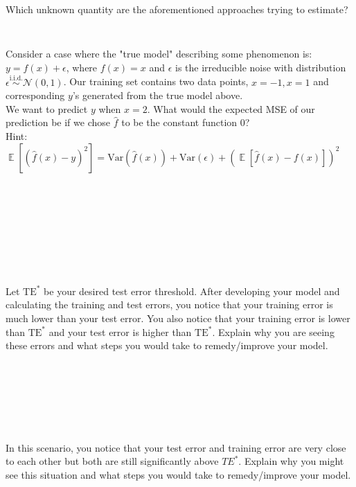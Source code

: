 \documentclass{article}
\DeclareMathOperator{\E}{\mathbb{E}}
\begin{document}
\bigskip
Which unknown quantity are the aforementioned approaches trying to estimate?
\begin{Verbatim}[frame=single]


\end{Verbatim}
\bigskip
Consider a case where the "true model" describing some phenomenon is:
$y=f(x)+\epsilon$, where $f(x) = x$ and $\epsilon$ is the irreducible noise
with
distribution $\epsilon \overset{\mathrm{i.i.d.}}{\sim}\mathcal{N}(0,1)$. Our
training set contains two data
points, $x = -1, x=1$ and corresponding $y$'s generated from the true model
above.
\\
We want to predict $y$ when $x = 2$. What would the expected MSE of our
prediction be if we chose $\hat{f}$ to be the constant function $0$?
\\
Hint:
$\E\left[\left(\hat{f}(x)-y\right)^2\right]=\text{Var}\left(\hat{f}(x)\right)+
  \text{Var}(\epsilon)+\left(\E\left[\hat{f}(x)-f(x)\right]\right)^2$
\begin{Verbatim}[frame=single]









\end{Verbatim}

\bigskip
Let $\mathrm{TE}^*$ be your desired test error threshold. After developing your
model and calculating the training and test errors, you notice that your
training error is much lower than your test error. You also notice that your
training error is lower than $\mathrm{TE}^*$ and your test error is higher than
$\mathrm{TE}^*$. Explain why you are seeing these errors and what steps you
would take to remedy/improve your model.

\begin{Verbatim}[frame=single]







\end{Verbatim}

\bigskip
In this scenario, you notice that your test error and training error are very close to each other but both are still significantly above $TE^*$. Explain why you might see this situation and what steps you would take to remedy/improve your model.

\begin{Verbatim}[frame=single]






\end{Verbatim}
\bigskip
\end{document}

